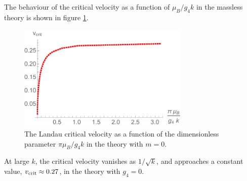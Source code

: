  The behaviour of the critical velocity as a function of $\mu_B/g_4 k$ in the massless theory is shown in figure \ref{vcrit}.
 \begin{figure}[h]
\begin{center}
\includegraphics[height=2.0in]{Chapter_3_Folder_1806.06976/figures/vcrit.pdf}
\end{center}
     \caption[This figure shows the Landau critical velocity as a function of the dimensionless parameter $\pi\frac{\mu_B}{g_4 k}$ in the theory with $m=0$.]{ \small{The Landau critical velocity as a function of the dimensionless parameter $\pi\mu_B/g_4 k$ in the theory with $m=0$.}}
\label{vcrit}
\end{figure}
 At large $k$, the critical velocity vanishes as $1/\sqrt{k}$, and approaches a constant value, $v_{\rm crit}\approx 0.27$, in the theory with $g_4=0$.
